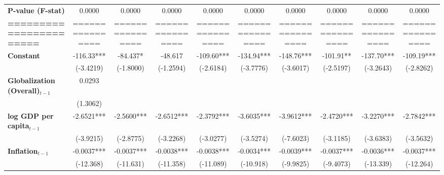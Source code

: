 \begin{center}
\begin{tabular}{lccccccccc}
\textbf{P-value (F-stat)}          &       0.0000       &       0.0000       &       0.0000       &       0.0000       &       0.0000       &       0.0000       &       0.0000       &       0.0000       &       0.0000        \\
\textbf{=======================}   &  ================  &  ================  &  ================  &  ================  &  ================  &  ================  &  ================  &  ================  &  ================   \\
\textbf{Constant}                     &     -116.33***     &      -84.437*      &      -48.617       &     -109.60***     &     -134.94***     &     -148.76***     &     -101.91**      &     -137.70***     &     -109.19***      \\
\textbf{ }                         &     (-3.4219)      &     (-1.8000)      &     (-1.2594)      &     (-2.6184)      &     (-3.7776)      &     (-3.6017)      &     (-2.5197)      &     (-3.2643)      &     (-2.8262)       \\
\textbf{Globalization (Overall)$_{t-1}$}               &       0.0293       &                    &                    &                    &                    &                    &                    &                    &                     \\
\textbf{ }                         &      (1.3062)      &                    &                    &                    &                    &                    &                    &                    &                     \\
\textbf{log GDP per capita$_{t-1}$}           &     -2.6521***     &     -2.5600***     &     -2.6512***     &     -2.3792***     &     -3.6035***     &     -3.9612***     &     -2.4720***     &     -3.2270***     &     -2.7842***      \\
\textbf{ }                         &     (-3.9215)      &     (-2.8775)      &     (-3.2268)      &     (-3.0277)      &     (-3.5274)      &     (-7.6023)      &     (-3.1185)      &     (-3.6383)      &     (-3.5632)       \\
\textbf{Inflation$_{t-1}$}      &     -0.0037***     &     -0.0037***     &     -0.0038***     &     -0.0038***     &     -0.0034***     &     -0.0039***     &     -0.0037***     &     -0.0036***     &     -0.0037***      \\
\textbf{ }                         &     (-12.368)      &     (-11.631)      &     (-11.358)      &     (-11.089)      &     (-10.918)      &     (-9.9825)      &     (-9.4073)      &     (-13.339)      &     (-12.264)       \\

\end{tabular}
\end{center}
